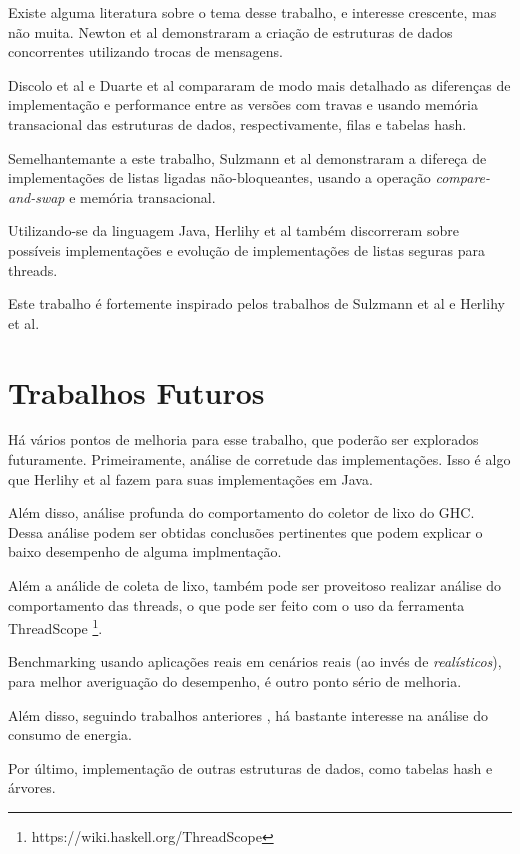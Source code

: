 \documentclass[a4paper,12pt,oldfontcommands]{abntex2}
\begin{document}
Existe alguma literatura sobre o tema desse trabalho, e interesse crescente, mas não muita. Newton et al \cite{newton2011intel} demonstraram a criação de estruturas de dados concorrentes utilizando trocas de mensagens.

Discolo et al \cite{discolo2006lock} e Duarte et al \cite{duarte2016concurrent} compararam de modo mais detalhado as diferenças de implementação e performance entre as versões com travas e usando memória transacional das estruturas de dados, respectivamente, filas e tabelas hash.

Semelhantemante a este trabalho, Sulzmann et al \cite{sulzmann2009comparing} demonstraram a difereça de implementações de listas ligadas não-bloqueantes, usando a operação \textit{compare-and-swap} e memória transacional.

Utilizando-se da linguagem Java, Herlihy et al \cite{herlihy2011art} também discorreram sobre possíveis implementações e evolução de implementações de listas seguras para threads.

Este trabalho é fortemente inspirado pelos trabalhos de Sulzmann et al e Herlihy et al.

\section{Trabalhos Futuros}

Há vários pontos de melhoria para esse trabalho, que poderão ser explorados futuramente. Primeiramente, análise de corretude das implementações. Isso é algo que Herlihy et al \cite{herlihy2011art} fazem para suas implementações em Java.

Além disso, análise profunda do comportamento do coletor de lixo do GHC. Dessa análise podem ser obtidas conclusões pertinentes que podem explicar o baixo desempenho de alguma implmentação.

Além a análide de coleta de lixo, também pode ser proveitoso realizar análise do comportamento das threads, o que pode ser feito com o uso da ferramenta ThreadScope \footnote{https://wiki.haskell.org/ThreadScope}.

Benchmarking usando aplicações reais em cenários reais (ao invés de \textit{realísticos}), para melhor averiguação do desempenho, é outro ponto sério de melhoria.

Além disso, seguindo trabalhos anteriores \cite{lima2016haskell}, há bastante interesse na análise do consumo de energia.

Por último, implementação de outras estruturas de dados, como tabelas hash e árvores.



\end{document}
